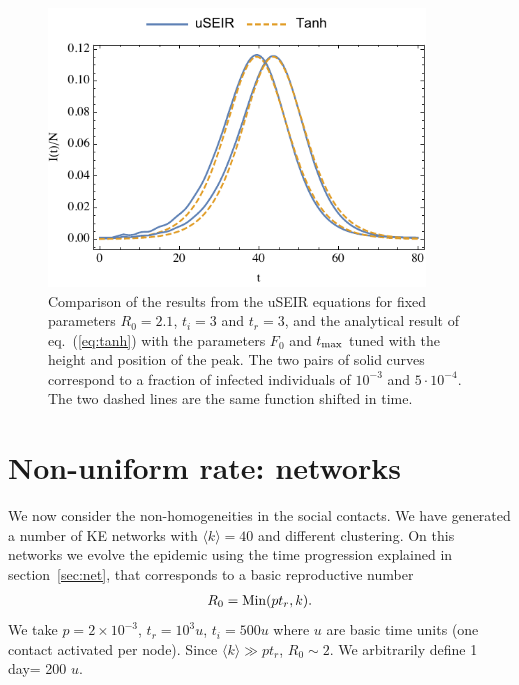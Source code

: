 \documentclass[a4paper,oneside,11pt]{article}
\begin{document}
\begin{figure}[h!]
  \centering
  \includegraphics[width=10cm]{logistica.pdf}
  \caption{Comparison of the results from the uSEIR equations for fixed parameters $R_0=2.1$, $t_i=3$ and $t_r=3$, and the analytical result of  eq.~(\ref{eq:tanh}) with the parameters $F_0$ and $t_{\rm max}$ tuned with the height and position of the peak. The two pairs of solid curves correspond to a fraction of infected individuals of $10^{-3}$ and $5\cdot 10^{-4}$. The two dashed lines are the same function shifted in time.}
  \label{fig:logistic}
   \end{figure}

 \section{Non-uniform rate: networks  }
\label{sec:r}

We now consider the non-homogeneities in the social contacts. 
We have generated a number of KE networks with $\langle k \rangle = 40$ and different clustering. On this networks we evolve the epidemic using the time progression explained in section~\ref{sec:net}, that corresponds to a basic reproductive number
\begin{eqnarray}
R_0 = {\rm Min}(p t_r, k). 
\end{eqnarray}
We take $p=2 \times 10^{-3}$, $t_r= 10^3 u$, $t_i=500 u$ where $u$ are  basic time units (one contact activated per node). Since  $\langle k \rangle \gg p t_r$, $R_0 \sim 2$. We arbitrarily define 1 day= 200 $u$. 
\end{document}
